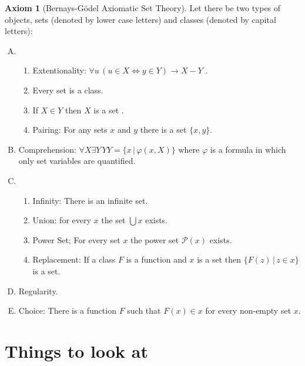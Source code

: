 \documentclass{article}
\theoremstyle{definition}
\newtheorem{axm}[thm]{Axiom}
\newcommand{\powset}[1]{\mathcal{P}(#1)}
\begin{document}
\begin{axm}[Bernays-G\"odel Axiomatic Set Theory]
    Let there be two types of objects, sets (denoted by lower case letters) and classes (denoted by capital letters):
    \begin{enumerate}[(A)]
        \item 
        \begin{enumerate}[1.]
            \item Extentionality: $\forall u \, (u \in X \iff y \in Y) \to X - Y$ .
            \item Every set is a class.
            \item If $X \in Y$ then $X$ is a set .
            \item Pairing: For any sets $x$ and $y$ there is a set $\{x, y\}$.            
        \end{enumerate}
        
        \item Comprehension: $\forall X \exists Y \, Y Y = \{x \, | \, \varphi(x, X) \}$ where $\varphi$ is a formula in which only set variables are quantified.
        
        \item 
        \begin{enumerate}[1.]
            \item Infinity: There is an infinite set.
            \item Union: for every $x$ the set $\bigcup x$ exists.
            \item Power Set; For every set $x$ the power set $\powset{x}$ exists.
            \item Replacement: If a class $F$ is a function and $x$ is a set then $\{ F(z) \, | \, z \in x \}$ is a set. 
        \end{enumerate}

        \item Regularity.
        
        \item Choice: There is a function $F$ such that $F(x) \in x$ for every non-empty set $x$. 
    \end{enumerate}
\end{axm}

\newpage

\section{Things to look at}
\end{document}
